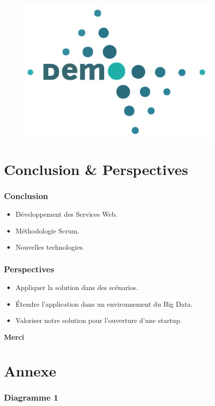 \documentclass{beamer}
\begin{document}
\begin{frame}
    \begin{center}
    \begin{figure}
        \includegraphics[width=0.9\textwidth]{./figures/demo}
    \end{figure}
    \end{center}
\end{frame}

\section{Conclusion \& Perspectives}

\begin{frame}
    \frametitle{Conclusion}
    \begin{itemize}
        \item<1-> Développement des Services Web.
        \item<2-> Méthodologie Scrum.
        \item<3-> Nouvelles technologies.
    \end{itemize}
\end{frame}

\begin{frame}
    \frametitle{Perspectives}
    \begin{itemize}
        \item<1-> Appliquer la solution dans des scénarios.
        \item<2-> Étendre l'application dans un environnement du Big Data.
        \item<3-> Valoriser notre solution pour l'ouverture d'une startup.
    \end{itemize}
\end{frame}

\begin{frame}
    \begin{center}
        \bfseries \Huge
        Merci
    \end{center}
\end{frame}

\section*{Annexe}
\begin{frame}
\frametitle{Diagramme 1}
\end{frame}
\end{document}
